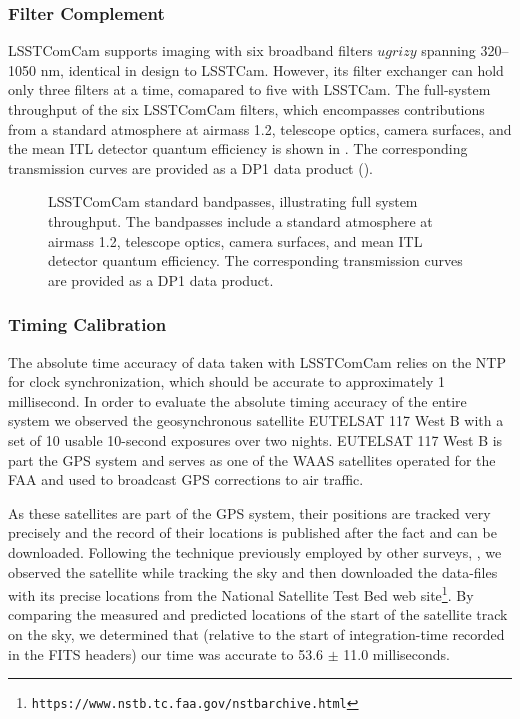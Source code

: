 \subsubsection{Filter Complement}
\label{sssec:comcam_filters}
\gls{LSSTComCam} supports imaging with six broadband filters $ugrizy$ spanning 320--1050 nm, identical in design to \gls{LSSTCam}.
However, its filter exchanger can hold only three filters at a time, comapared to five with \gls{LSSTCam}.
The full-system throughput of the six \gls{LSSTComCam} filters, which encompasses contributions from a standard atmosphere at airmass 1.2, telescope optics, camera surfaces, and the mean \gls{ITL} detector quantum efficiency is shown in .
The corresponding transmission curves are provided as a \gls{DP1} data product ().
\begin{figure}[htb!]
\caption{\gls{LSSTComCam} standard bandpasses, illustrating full system throughput. The bandpasses include a standard atmosphere at airmass 1.2, telescope optics, camera surfaces, and mean \gls{ITL} detector quantum efficiency. The corresponding transmission curves are provided as a \gls{DP1} data product.}
\label{fig:comcam_standard_bandpasses}
\end{figure}

\subsubsection{Timing Calibration}
\label{ssec:comcam_timing}
The absolute time accuracy of data taken with \gls{LSSTComCam} relies on the \gls{NTP} for clock synchronization, which should be accurate to approximately 1 millisecond.
In order to evaluate the absolute timing accuracy of the entire system we observed the geosynchronous satellite EUTELSAT 117 West B with a set of 10 usable 10-second exposures over two nights.
EUTELSAT 117 West B is part the \gls{GPS} system and serves as one of the \gls{WAAS} satellites operated for the \gls{FAA} and used to broadcast \gls{GPS} corrections to air traffic.

As these satellites are part of the \gls{GPS} system, their positions are tracked very precisely and the record of their locations is published after the fact and can be downloaded.
Following the technique previously employed by other surveys, \citep{2018PASP..130f4505T},  we observed the satellite while tracking the sky and then downloaded the data-files with its precise locations from the National Satellite Test Bed web site\footnote{\nolinkurl{https://www.nstb.tc.faa.gov/nstbarchive.html}}.
By comparing the measured and predicted locations of the start of the satellite track on the sky, we determined that (relative to the start of integration-time recorded in the \gls{FITS} headers) our time was accurate to 53.6 $\pm$ 11.0 milliseconds.

